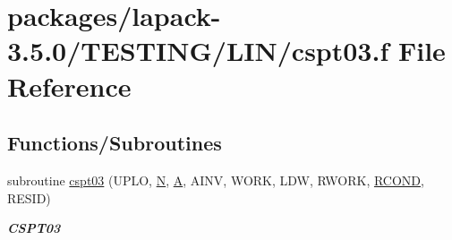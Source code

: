 \hypertarget{cspt03_8f}{}\section{packages/lapack-\/3.5.0/\+T\+E\+S\+T\+I\+N\+G/\+L\+I\+N/cspt03.f File Reference}
\label{cspt03_8f}
\subsection*{Functions/\+Subroutines}
\begin{DoxyCompactItemize}
\item 
subroutine \hyperlink{group__complex__lin_ga96348e9932f381bfaf1bbd8e9949ef29}{cspt03} (U\+P\+L\+O, \hyperlink{polmisc_8c_a0240ac851181b84ac374872dc5434ee4}{N}, \hyperlink{classA}{A}, A\+I\+N\+V, W\+O\+R\+K, L\+D\+W, R\+W\+O\+R\+K, \hyperlink{superlu__enum__consts_8h_af00a42ecad444bbda75cde1b64bd7e72a9b5c151728d8512307565994c89919d5}{R\+C\+O\+N\+D}, R\+E\+S\+I\+D)
\begin{DoxyCompactList}\small\item\em {\bfseries C\+S\+P\+T03} \end{DoxyCompactList}\end{DoxyCompactItemize}
